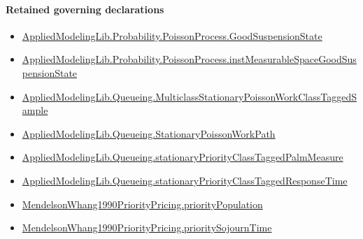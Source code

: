 \documentclass[10pt]{article}
\begin{document}
\paragraph{Retained governing declarations}
\begin{itemize}\raggedright
\item \hyperlink{governing-declaration-ab1cfe37ad8c32b0}{Applied\allowbreak{}Modeling\allowbreak{}Lib.\allowbreak{}Probability.\allowbreak{}Poisson\allowbreak{}Process.\allowbreak{}Good\allowbreak{}Suspension\allowbreak{}State}
\item \hyperlink{governing-declaration-a8385d799d0a4d16}{Applied\allowbreak{}Modeling\allowbreak{}Lib.\allowbreak{}Probability.\allowbreak{}Poisson\allowbreak{}Process.\allowbreak{}inst\allowbreak{}Measurable\allowbreak{}Space\allowbreak{}Good\allowbreak{}Suspension\allowbreak{}State}
\item \hyperlink{library-prerequisite-755cdb28ceaf46d2}{Applied\allowbreak{}Modeling\allowbreak{}Lib.\allowbreak{}Queueing.\allowbreak{}Multiclass\allowbreak{}Stationary\allowbreak{}Poisson\allowbreak{}Work\allowbreak{}Class\allowbreak{}Tagged\allowbreak{}Sample}
\item \hyperlink{governing-declaration-62a268164b6ae28b}{Applied\allowbreak{}Modeling\allowbreak{}Lib.\allowbreak{}Queueing.\allowbreak{}Stationary\allowbreak{}Poisson\allowbreak{}Work\allowbreak{}Path}
\item \hyperlink{library-prerequisite-c3ca5cbd067c9957}{Applied\allowbreak{}Modeling\allowbreak{}Lib.\allowbreak{}Queueing.\allowbreak{}stationary\allowbreak{}Priority\allowbreak{}Class\allowbreak{}Tagged\allowbreak{}Palm\allowbreak{}Measure}
\item \hyperlink{library-prerequisite-6b2b5577562811ed}{Applied\allowbreak{}Modeling\allowbreak{}Lib.\allowbreak{}Queueing.\allowbreak{}stationary\allowbreak{}Priority\allowbreak{}Class\allowbreak{}Tagged\allowbreak{}Response\allowbreak{}Time}
\item \hyperlink{governing-declaration-65f779b7d3134146}{Mendelson\allowbreak{}Whang1990\allowbreak{}Priority\allowbreak{}Pricing.\allowbreak{}priority\allowbreak{}Population}
\item \hyperlink{governing-declaration-703b87082556903f}{Mendelson\allowbreak{}Whang1990\allowbreak{}Priority\allowbreak{}Pricing.\allowbreak{}priority\allowbreak{}Sojourn\allowbreak{}Time}
\end{itemize}
\end{document}

